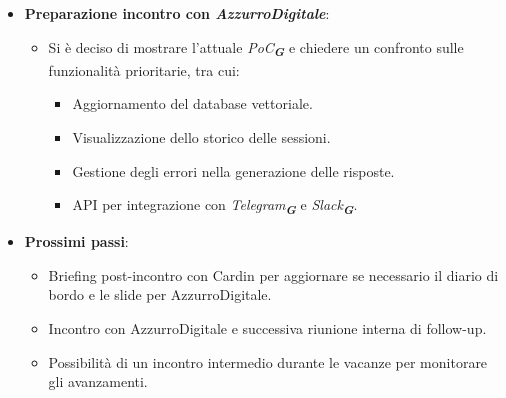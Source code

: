 \begin{itemize}
    \item \textbf{Preparazione incontro con \emph{AzzurroDigitale}}:  
    \begin{itemize}
        \item Si è deciso di mostrare l'attuale \emph{PoC}\textsubscript{\textit{\textbf{G}}} e chiedere un confronto sulle funzionalità prioritarie, tra cui:  
        \begin{itemize}
            \item Aggiornamento del database vettoriale.  
            \item Visualizzazione dello storico delle sessioni.  
            \item Gestione degli errori nella generazione delle risposte.  
            \item API per integrazione con \emph{Telegram}\textsubscript{\textit{\textbf{G}}} e \emph{Slack}\textsubscript{\textit{\textbf{G}}}.  
        \end{itemize}
    \end{itemize}
    \item \textbf{Prossimi passi}:  
    \begin{itemize}
        \item Briefing post-incontro con Cardin per aggiornare se necessario il diario di bordo e le slide per AzzurroDigitale.  
        \item Incontro con AzzurroDigitale e successiva riunione interna di follow-up.  
        \item Possibilità di un incontro intermedio durante le vacanze per monitorare gli avanzamenti.  
    \end{itemize}
\end{itemize}
